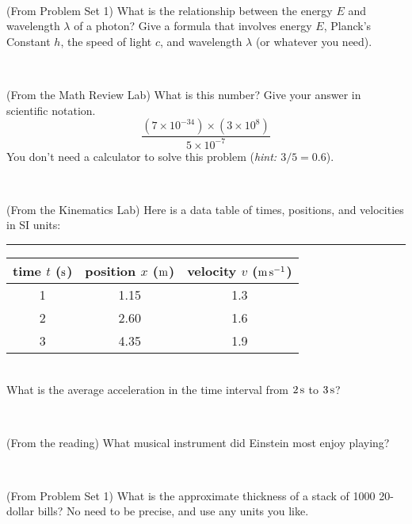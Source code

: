 \documentclass[12pt, letterpaper]{article}
\begin{document}
\vfill ~

\begin{problem} (From Problem Set 1)
What is the relationship between the energy $E$ and wavelength
$\lambda$ of a photon? Give a formula that involves energy $E$,
Planck's Constant $h$, the speed of light $c$, and wavelength
$\lambda$ (or whatever you need).
\end{problem}

\vfill ~


\clearpage


\begin{problem} (From the Math Review Lab)
What is this number? Give your answer in scientific notation.
$$
\frac{(7\times10^{-34})\times(3\times10^8)}{5\times10^{-7}}
$$
You don't need a calculator to solve this problem (\textit{hint: $3/5=0.6$}).
\end{problem}


\vfill ~

\begin{problem} (From the Kinematics Lab)
Here is a data table of times, positions, and velocities in SI units:\\
\rule{1.0in}{0pt}\begin{tabular}{c|c|c}
time $t$ ($\mathrm{s}$) & position $x$ ($\mathrm{m}$) & velocity $v$ ($\mathrm{m}\,\mathrm{s}^{-1}$) \\
\hline
1 & 1.15 & 1.3 \\
2 & 2.60 & 1.6 \\
3 & 4.35 & 1.9 \\
\hline
\end{tabular}\\
What is the average acceleration in the time interval from $2\,\mathrm{s}$ to $3\,\mathrm{s}$?
\end{problem}


\vfill ~

\begin{problem} (From the reading)
What musical instrument did Einstein most enjoy playing?
\end{problem}


\vfill ~

\begin{problem} (From Problem Set 1)
What is the approximate thickness of a stack of 1000 20-dollar bills?
No need to be precise, and use any units you like.
\end{problem}


\vfill ~


\cleardoublepage
\end{document}
